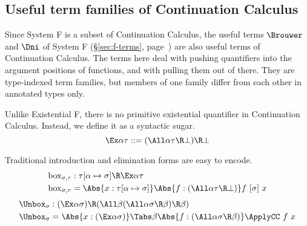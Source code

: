 \documentclass{amsart}
\begin{document}
\nc{}

\nc{}

\nc{}

\nc{}

\FRules

\DoubleNegationElimination

\ExistentialElimination

\subsection{Useful term families of Continuation Calculus}

Since System F is a subset of Continuation Calculus, the useful
terms $\Brouwer$ and $\Dni$ of System F (\S\ref{sec:f-terms},
page~\pageref{sec:f-terms}) are also useful terms of Continuation
Calculus. The terms here deal with pushing quantifiers into the
argument positions of functions, and with pulling them out of
there. They are type-indexed term families, but members of one
family differ from each other in annotated types only.

Unlike Existential F, there is no primitive existential
quantifier in Continuation Calculus. Instead, we define it as a
syntactic sugar.
\[
\Ex\alpha \tau ::= (\All\alpha \tau \R \bot) \R \bot
\]

Traditional introduction and elimination forms are easy to
encode.
\begin{align*}
\Box_{\sigma,\tau} & :
  \tau[\alpha\mapsto\sigma] \R \Ex\alpha\tau
  \\
\Box_{\sigma,\tau} & =
  \Abs{x : \tau[\alpha\mapsto\sigma]}
  \Abs{f : (\All\alpha \tau \R \bot)}
  f~[\sigma]~x
\end{align*}
%
\begin{align*}
\Unbox_{\sigma} & :
  (\Ex\alpha\sigma) \R
  (\All\beta (\All\alpha \sigma \R \beta) \R \beta)
  \\
\Unbox_{\sigma} & =
  \Abs{x : (\Ex\alpha\sigma)}
  \Tabs\beta
  \Abs{f : (\All\alpha \sigma \R \beta)}
  \ApplyCC~f~x
\end{align*}
\end{document}
